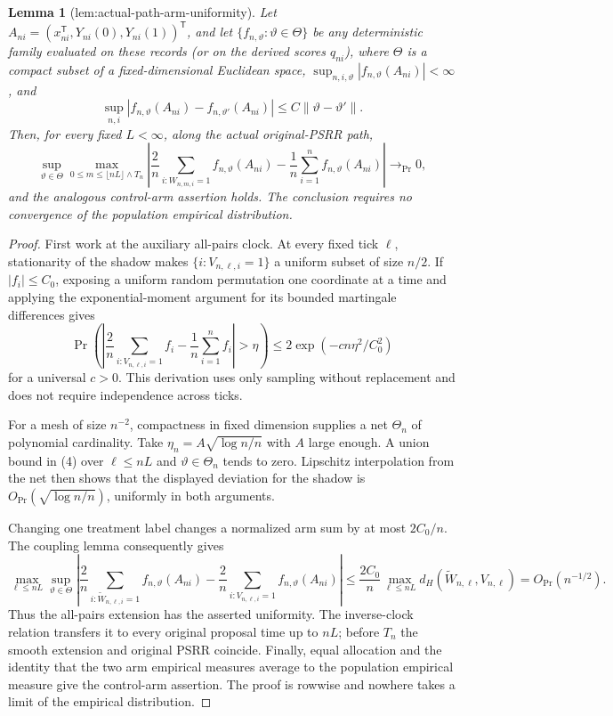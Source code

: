 \documentclass{article}
\newtheorem{lemma}{Lemma}
\begin{document}
\begin{lemma}[lem:actual-path-arm-uniformity]\label{lem:actual-path-arm-uniformity}
Let \(A_{ni}=(x_{ni}^{\mathsf T},Y_{ni}(0),Y_{ni}(1))^{\mathsf T}\), and let \(\{f_{n,\vartheta}:\vartheta\in\Theta\}\) be any deterministic family evaluated on these records (or on the derived scores \(q_{ni}\)), where \(\Theta\) is a compact subset of a fixed-dimensional Euclidean space, \(\sup_{n,i,\vartheta}|f_{n,\vartheta}(A_{ni})|<\infty\), and
\[
 \sup_{n,i}|f_{n,\vartheta}(A_{ni})-f_{n,\vartheta'}(A_{ni})|\le C\|\vartheta-\vartheta'\|.
\]
Then, for every fixed \(L<\infty\), along the actual original-PSRR path,
\[
 \sup_{\vartheta\in\Theta}\max_{0\le m\le\lfloor nL\rfloor\wedge T_n}
 \left|\frac2n\sum_{i:W_{n,m,i}=1}f_{n,\vartheta}(A_{ni})-\frac1n\sum_{i=1}^nf_{n,\vartheta}(A_{ni})\right|
 \longrightarrow_{\Pr}0,
\]
and the analogous control-arm assertion holds.  The conclusion requires no convergence of the population empirical distribution.
\end{lemma}
\begin{proof}
First work at the auxiliary all-pairs clock.  At every fixed tick \(\ell\), stationarity of the shadow makes \(\{i:V_{n,\ell,i}=1\}\) a uniform subset of size \(n/2\).  If \(|f_i|\le C_0\), exposing a uniform random permutation one coordinate at a time and applying the exponential-moment argument for its bounded martingale differences gives
\[
 \Pr\left(\left|\frac2n\sum_{i:V_{n,\ell,i}=1}f_i-\frac1n\sum_{i=1}^nf_i\right|>\eta\right)
 \le2\exp(-c n\eta^2/C_0^2) \tag{4}
\]
for a universal \(c>0\).  This derivation uses only sampling without replacement and does not require independence across ticks.

For a mesh of size \(n^{-2}\), compactness in fixed dimension supplies a net \(\Theta_n\) of polynomial cardinality.  Take \(\eta_n=A\sqrt{\log n/n}\) with \(A\) large enough.  A union bound in (4) over \(\ell\le nL\) and \(\vartheta\in\Theta_n\) tends to zero.  Lipschitz interpolation from the net then shows that the displayed deviation for the shadow is \(O_{\Pr}(\sqrt{\log n/n})\), uniformly in both arguments.

Changing one treatment label changes a normalized arm sum by at most \(2C_0/n\).  The coupling lemma consequently gives
\[
 \max_{\ell\le nL}\sup_{\vartheta\in\Theta}
 \left|\frac2n\sum_{i:\widetilde W_{n,\ell,i}=1}f_{n,\vartheta}(A_{ni})
 -\frac2n\sum_{i:V_{n,\ell,i}=1}f_{n,\vartheta}(A_{ni})\right|
 \le \frac{2C_0}{n}\max_{\ell\le nL}d_H(\widetilde W_{n,\ell},V_{n,\ell})
 =O_{\Pr}(n^{-1/2}).
\]
Thus the all-pairs extension has the asserted uniformity.  The inverse-clock relation transfers it to every original proposal time up to \(nL\); before \(T_n\) the smooth extension and original PSRR coincide.  Finally, equal allocation and the identity that the two arm empirical measures average to the population empirical measure give the control-arm assertion.  The proof is rowwise and nowhere takes a limit of the empirical distribution.
\end{proof}
\end{document}
